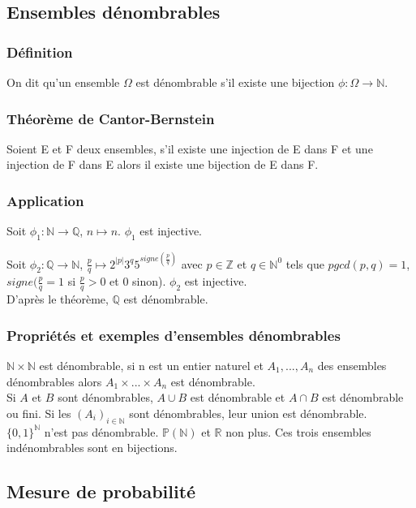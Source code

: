 \documentclass[a4paper,10pt]{book} %
\newcommand{\R}{\mathbb{R}}
\newcommand{\N}{\mathbb{N}}
\newcommand{\Z}{\mathbb{Z}}
\newcommand{\Q}{\mathbb{Q}}
\renewcommand{\P}{\mathbb{P}} %
\newcommand\abs[1]{\left|#1\right|}
\begin{document}
\subsection{Ensembles dénombrables}
\subsubsection{Définition}
On dit qu'un ensemble $\Omega$ est dénombrable s'il existe une bijection $\phi : \Omega \rightarrow \N$.

\subsubsection{Théorème de Cantor-Bernstein}
Soient E et F deux ensembles, s'il existe une injection de E dans F et une injection de F dans E alors il existe une bijection de E dans F.

\subsubsection{Application}
Soit $\phi_1: \N\rightarrow\Q$, $n\mapsto n$. $\phi_1$ est injective.

Soit $\phi_2: \Q\rightarrow \N$, $\frac{p}{q}\mapsto 2^{\abs{p}}3^q5^{signe(\frac{p}{q})}$ avec $p\in \Z$ et $q\in \N^0$ tels que $pgcd(p,q)=1$, $signe(\frac{p}{q}=1$ si $\frac{p}{q}>0$ et $0$ sinon). $\phi_2$ est injective.\\

D'après le théorème, $\Q$ est dénombrable.

\subsubsection{Propriétés et exemples d'ensembles dénombrables}
$\N\times \N$ est dénombrable, si n est un entier naturel et $A_1,...,A_n$ des ensembles dénombrables alors $A_1\times...\times A_n$ est dénombrable.\\

Si $A$ et $B$ sont dénombrables, $A\cup B$ est dénombrable et $A\cap B$ est dénombrable ou fini. Si les $(A_i)_{i\in \N}$ sont dénombrables, leur union est dénombrable.\\

$\{0,1\}^\N$ n'est pas dénombrable. $\P(\N)$ et $\R$ non plus. Ces trois ensembles indénombrables sont en bijections.

\subsection{Mesure de probabilité}
\end{document}
